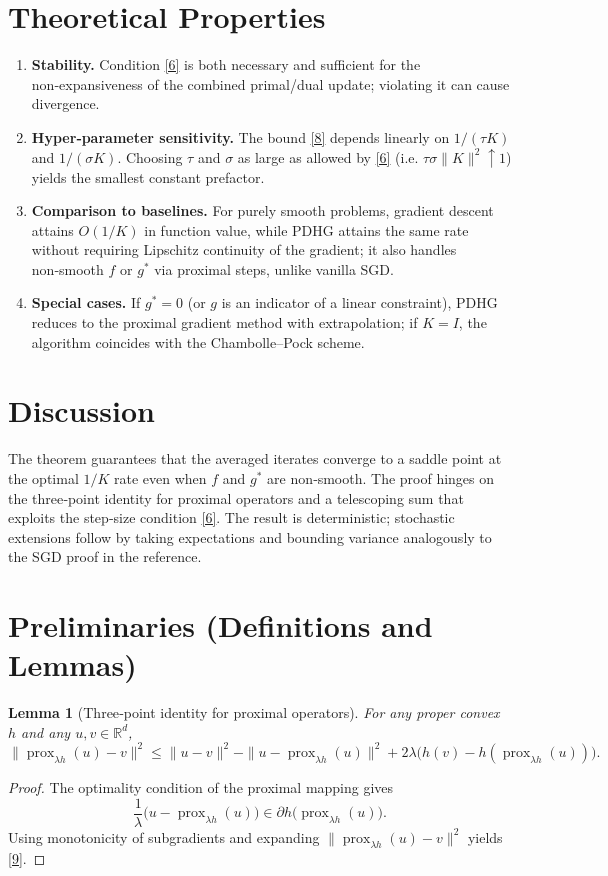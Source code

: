\documentclass{article}
\newtheorem{lemma}{Lemma}
\newcommand{\prox}{\operatorname{prox}}
\begin{document}
\section*{Theoretical Properties}
\begin{enumerate}[label=(\roman*)]
\item \textbf{Stability.} Condition \eqref{6} is both necessary and sufficient for the non‑expansiveness of the combined primal/dual update; violating it can cause divergence.
\item \textbf{Hyper‑parameter sensitivity.} The bound \eqref{8} depends linearly on $1/(\tau K)$ and $1/(\sigma K)$. Choosing $\tau$ and $\sigma$ as large as allowed by \eqref{6} (i.e. $\tau\sigma\|K\|^{2}\uparrow 1$) yields the smallest constant prefactor.
\item \textbf{Comparison to baselines.} For purely smooth problems, gradient descent attains $O(1/K)$ in function value, while PDHG attains the same rate without requiring Lipschitz continuity of the gradient; it also handles non‑smooth $f$ or $g^{*}$ via proximal steps, unlike vanilla SGD.
\item \textbf{Special cases.} If $g^{*}=0$ (or $g$ is an indicator of a linear constraint), PDHG reduces to the proximal gradient method with extrapolation; if $K=I$, the algorithm coincides with the Chambolle–Pock scheme.
\end{enumerate}

\section*{Discussion}
The theorem guarantees that the averaged iterates converge to a saddle point at the optimal $1/K$ rate even when $f$ and $g^{*}$ are non‑smooth. The proof hinges on the three‑point identity for proximal operators and a telescoping sum that exploits the step‑size condition \eqref{6}. The result is deterministic; stochastic extensions follow by taking expectations and bounding variance analogously to the SGD proof in the reference.

\section*{Preliminaries (Definitions and Lemmas)}
\begin{lemma}[Three‑point identity for proximal operators]
\label{lem:threepoint}
For any proper convex $h$ and any $u,v\in\mathbb{R}^{d}$,
\[
\| \prox_{\lambda h}(u)-v \|^{2}
\le
\|u-v\|^{2}
- \|u-\prox_{\lambda h}(u)\|^{2}
+2\lambda\bigl( h(v)-h(\prox_{\lambda h}(u))\bigr).
\tag{9}
\]
\end{lemma}
\begin{proof}
The optimality condition of the proximal mapping gives
\[
\frac{1}{\lambda}\bigl(u-\prox_{\lambda h}(u)\bigr)\in\partial h\bigl(\prox_{\lambda h}(u)\bigr).
\]
Using monotonicity of subgradients and expanding $\| \prox_{\lambda h}(u)-v\|^{2}$ yields \eqref{9}. \qedhere
\end{proof}
\end{document}
